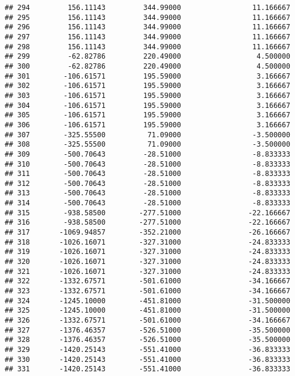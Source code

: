 \documentclass[]{article}
\begin{document}
\begin{verbatim}
## 294         156.11143         344.99000                 11.166667
## 295         156.11143         344.99000                 11.166667
## 296         156.11143         344.99000                 11.166667
## 297         156.11143         344.99000                 11.166667
## 298         156.11143         344.99000                 11.166667
## 299         -62.82786         220.49000                  4.500000
## 300         -62.82786         220.49000                  4.500000
## 301        -106.61571         195.59000                  3.166667
## 302        -106.61571         195.59000                  3.166667
## 303        -106.61571         195.59000                  3.166667
## 304        -106.61571         195.59000                  3.166667
## 305        -106.61571         195.59000                  3.166667
## 306        -106.61571         195.59000                  3.166667
## 307        -325.55500          71.09000                 -3.500000
## 308        -325.55500          71.09000                 -3.500000
## 309        -500.70643         -28.51000                 -8.833333
## 310        -500.70643         -28.51000                 -8.833333
## 311        -500.70643         -28.51000                 -8.833333
## 312        -500.70643         -28.51000                 -8.833333
## 313        -500.70643         -28.51000                 -8.833333
## 314        -500.70643         -28.51000                 -8.833333
## 315        -938.58500        -277.51000                -22.166667
## 316        -938.58500        -277.51000                -22.166667
## 317       -1069.94857        -352.21000                -26.166667
## 318       -1026.16071        -327.31000                -24.833333
## 319       -1026.16071        -327.31000                -24.833333
## 320       -1026.16071        -327.31000                -24.833333
## 321       -1026.16071        -327.31000                -24.833333
## 322       -1332.67571        -501.61000                -34.166667
## 323       -1332.67571        -501.61000                -34.166667
## 324       -1245.10000        -451.81000                -31.500000
## 325       -1245.10000        -451.81000                -31.500000
## 326       -1332.67571        -501.61000                -34.166667
## 327       -1376.46357        -526.51000                -35.500000
## 328       -1376.46357        -526.51000                -35.500000
## 329       -1420.25143        -551.41000                -36.833333
## 330       -1420.25143        -551.41000                -36.833333
## 331       -1420.25143        -551.41000                -36.833333

\end{verbatim}
\end{document}
